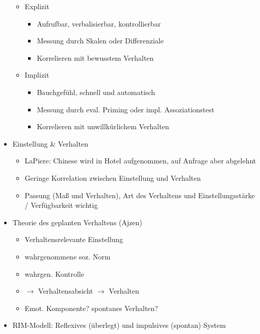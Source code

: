\documentclass[11pt, paper=a4, twocolumn]{scrartcl}
\begin{document}
\begin{itemize}
				\begin{itemize}
					\item Explizit
						\begin{itemize}
							\item Aufrufbar, verbalisierbar, kontrollierbar
							\item Messung durch Skalen oder Differenziale
							\item Korrelieren mit bewusstem Verhalten
						\end{itemize}
					\item Implizit
						\begin{itemize}
							\item Bauchgefühl, schnell und automatisch
							\item Messung durch eval. Priming oder impl. Assoziationstest
							\item Korrelieren mit unwillkürlichem Verhalten
						\end{itemize}
				\end{itemize}
			\item Einstellung \& Verhalten
				\begin{itemize}
					\item LaPiere: Chinese wird in Hotel aufgenommen, auf Anfrage aber abgelehnt
					\item Geringe Korrelation zwischen Einstellung und Verhalten
					\item Passung (Maß und Verhalten), Art des Verhaltens und Einstellungsstärke / Verfügbarkeit wichtig
				\end{itemize}
			\item Theorie des geplanten Verhaltens (Ajzen)
				\begin{itemize}
					\item Verhaltensrelevante Einstellung
					\item wahrgenommene soz. Norm
					\item wahrgen. Kontrolle
					\item $\rightarrow$ Verhaltensabsicht $\rightarrow$ Verhalten
					\item Emot. Komponente? spontanes Verhalten?
				\end{itemize}
			\item RIM-Modell: Reflexives (überlegt) und impulsives (spontan) System
		\end{itemize}
	
\end{document}
